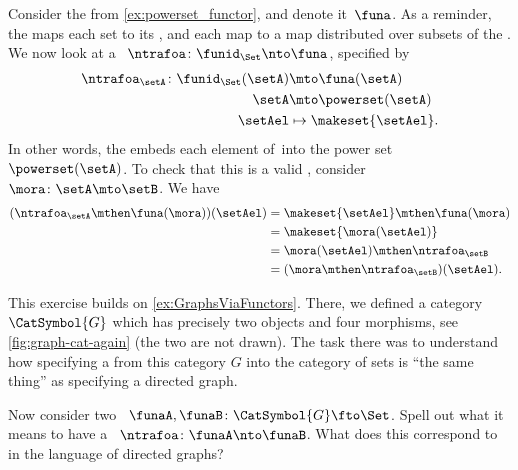 \begin{example}
    Consider the   from \cref{ex:powerset_functor}, and denote it~$\funa$.
    As a reminder, the  maps each set to its , and each map to a map distributed over subsets of the .
    We now look at a ~$\ntrafoa\colon \funid_\Set \nto \funa$, specified by
    \begin{equation}
        \begin{aligned}
            \ntrafoa_\setA\colon \funid_\Set(\setA) & \mto \funa(\setA) \\
            \setA                                   & \mto \powerset(\setA) \\
            \setAel                                 & \mapsto \makeset{\setAel}.
        \end{aligned}
    \end{equation}
    In other words, the  embeds each element of~\setA into the power set~$\powerset(\setA)$.
    To check that this is a valid , consider $\mora\colon \setA\mto \setB$.
    We have
    \begin{equation}
        \begin{aligned}
            (\ntrafoa_\setA \mthen \funa(\mora))(\setAel)
             & =\makeset{\setAel} \mthen \funa(\mora) \\
             & =\makeset{\mora(\setAel)} \\
             & =\mora(\setAel)\mthen \ntrafoa_\setB \\
             & =(\mora \mthen \ntrafoa_\setB)(\setAel).
        \end{aligned}
    \end{equation}
\end{example}

\vfill

\begin{marginfigure}
    \centering
    \caption{}
    \label{fig:graph-cat-again}
\end{marginfigure}
\begin{gradedexercise}
    \label{ex:NatTrafosGraphs}
    This exercise builds on \cref{ex:GraphsViaFunctors}.
    There, we defined a category~$\CatSymbol{G}$ which has precisely two objects and four morphisms, see \cref{fig:graph-cat-again} (the two  are not drawn).
    The task there was to understand how specifying a  from this category $G$ into the category of sets is ``the same thing'' as specifying a directed graph.

    Now consider two ~$\funaA, \funaB \colon \CatSymbol{G} \fto \Set$.
    Spell out what it means to have a ~$\ntrafoa\colon \funaA \nto \funaB$.
    What does this correspond to in the language of directed graphs?
\end{gradedexercise}

